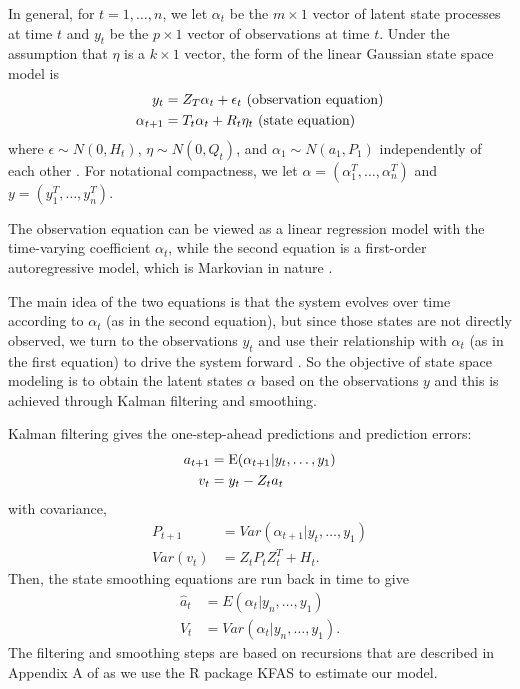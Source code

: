 \documentclass{article}
\begin{document}
In general, for $t = 1, \dots, n$, we let $\alpha_t$ be the $m \times 1$ vector of latent
state processes at time $t$ and $y_t$ be the $p \times 1$ vector of observations
at time $t$. Under the assumption that $\eta$ is a $k \times 1$ vector, the
form of the linear Gaussian state space model is 
\begin{align}
y_t &= Z_T\alpha_t + \epsilon_t  \text{     (observation equation)} \label{eq:ss1}\\
\alpha_{t+1} &= T_t\alpha_t + R_t\eta_t  \text{     (state equation) \label{eq:ss2}}
\end{align}
where $\epsilon \sim N(0, H_t)$, $\eta \sim N(0, Q_t)$, and $\alpha_1 \sim
N(a_1, P_1)$ independently of each other \citep{helske2017kfas}. For notational
compactness, we let $\alpha = \left ( \alpha_1^T, \dots, \alpha_n^T \right )$
and $y = \left ( y_1^T, \dots, y_n^T \right )$.

The observation equation can be viewed as a linear regression model with the
time-varying coefficient $\alpha_t$, while the second equation is a first-order
autoregressive model, which is Markovian in nature \citep{durbin2012time}. 

The main idea of the two equations is that the system evolves over time
according to $\alpha_t$ (as in the second equation), but since those states are
not directly observed, we turn to the observations $y_t$ and use their
relationship with $\alpha_t$ (as in the first equation) to drive the system
forward \citep{durbin2012time}. So the objective of state space modeling is to
obtain the latent states $\alpha$ based on the observations $y$ and this is
achieved through Kalman filtering and smoothing. 

Kalman filtering gives the one-step-ahead predictions and prediction errors:
\begin{align*}
a_{t+1} &= \textup{E}(\alpha_{t+1}|y_t, \dots, y_1) \\
v_t &= y_t - Z_ta_t
\end{align*} with covariance, 
\begin{align*}
P_{t+1} &= Var(\alpha_{t+1}|y_t, \dots, y_1) \\
Var(v_t) &= Z_tP_tZ_t^T + H_t.
\end{align*}
Then, the state smoothing equations are run back in time to give
\begin{align}
\hat{a}_t &= E(\alpha_{t}|y_n, \dots, y_1) \label{eq:hatat}\\
V_t &= Var(\alpha_{t}|y_n, \dots, y_1). \label{eq:Vt}
\end{align}
The filtering and smoothing steps are based on recursions that are described in
Appendix A of \citet{helske2017kfas} as we use the R package KFAS to estimate
our model.
\end{document}
